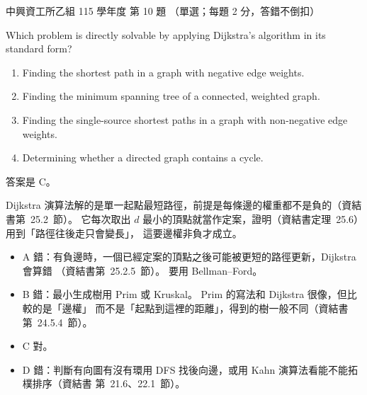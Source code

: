 \begin{pastexam}[label={px:nchu-115-is-10}]{中興資工所乙組 115 學年度 第 10 題}
（單選；每題 2 分，答錯不倒扣）

Which problem is directly solvable by applying Dijkstra's algorithm in its standard form?
\begin{enumerate}[label=\Alph*.,nosep]
\item Finding the shortest path in a graph with negative edge weights.
\item Finding the minimum spanning tree of a connected, weighted graph.
\item Finding the single-source shortest paths in a graph with non-negative edge weights.
\item Determining whether a directed graph contains a cycle.
\end{enumerate}
\end{pastexam}

\begin{pastsoln}
答案是 C。

Dijkstra 演算法解的是單一起點最短路徑，前提是每條邊的權重都不是負的（資結書第~25.2~節）。
它每次取出 $d$ 最小的頂點就當作定案，證明（資結書定理~25.6）用到「路徑往後走只會變長」，
這要邊權非負才成立。
\begin{itemize}
\item A 錯：有負邊時，一個已經定案的頂點之後可能被更短的路徑更新，Dijkstra 會算錯
（資結書第~25.2.5~節）。 要用 Bellman--Ford。
\item B 錯：最小生成樹用 Prim 或 Kruskal。 Prim 的寫法和 Dijkstra 很像，但比較的是「邊權」
而不是「起點到這裡的距離」，得到的樹一般不同（資結書第~24.5.4~節）。
\item C 對。
\item D 錯：判斷有向圖有沒有環用 DFS 找後向邊，或用 Kahn 演算法看能不能拓樸排序（資結書
第~21.6、22.1~節）。
\end{itemize}
\end{pastsoln}
